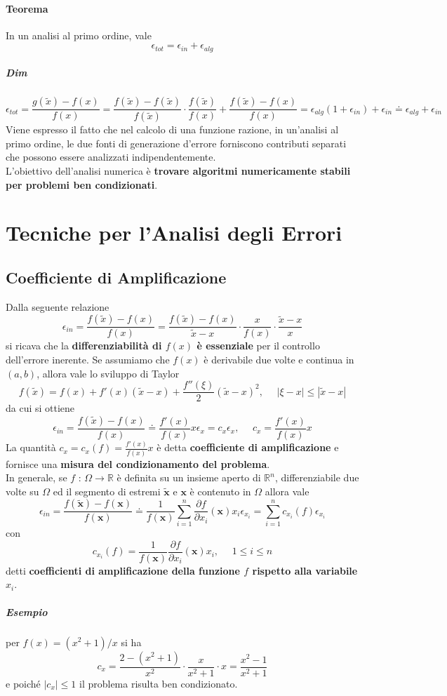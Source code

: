 \documentclass[10pt]{book}
\begin{document}
\paragraph{Teorema} In un analisi al primo ordine, vale $$\epsilon_{tot} = \epsilon_{in} + \epsilon_{alg}$$
\subparagraph{Dim} $$\epsilon_{tot} = \frac{g(\tilde{x}) - f(x)}{f(x)} = \frac{f(\tilde{x}) - f(\tilde{x})}{f(\tilde{x})}\cdot\frac{f(\tilde{x})}{f(x)} + \frac{f(\tilde{x}) - f(x)}{f(x)} = \epsilon_{alg}(1 + \epsilon_{in}) + \epsilon_{in} \doteq \epsilon_{alg} + \epsilon_{in}$$
Viene espresso il fatto che nel calcolo di una funzione razione, in un'analisi al primo ordine, le due fonti di generazione d'errore forniscono contributi separati che possono essere analizzati indipendentemente.\\
L'obiettivo dell'analisi numerica è \textbf{trovare algoritmi numericamente stabili per problemi ben condizionati}.
\section{Tecniche per l'Analisi degli Errori}
\subsection{Coefficiente di Amplificazione}
Dalla seguente relazione $$\epsilon_{in} = \frac{f(\tilde{x}) - f(x)}{f(x)} = \frac{f(\tilde{x}) - f(x)}{\tilde{x} - x}\cdot\frac{x}{f(x)}\cdot\frac{\tilde{x} - x}{x}$$ si ricava che la \textbf{differenziabilità di $f(x)$ è essenziale} per il controllo dell'errore inerente. Se assumiamo che $f(x)$ è derivabile due volte e continua in $(a, b)$, allora vale lo sviluppo di Taylor $$f(\tilde{x}) = f(x) + f'(x)(\tilde{x} - x) + \frac{f''(\xi)}{2}(\tilde{x} - x)^2,\:\:\:\:\:\:|\xi - x| \leq |\tilde{x} - x| $$ da cui si ottiene $$ \epsilon_{in} = \frac{f(\tilde{x}) - f(x)}{f(x)} \doteq \frac{f'(x)}{f(x)}x\epsilon_x = c_x\epsilon_x,\:\:\:\:\:\:c_x = \frac{f'(x)}{f(x)}x $$
La quantità $c_x = c_x(f) = \frac{f'(x)}{f(x)}x$ è detta \textbf{coefficiente di amplificazione} e fornisce una \textbf{misura del condizionamento del problema}.\\
In generale, se $f$ : $\Omega \rightarrow \mathbb{R}$ è definita su un insieme aperto di $\mathbb{R}^n$, differenziabile due volte su $\Omega$ ed il segmento di estremi $\tilde{\textbf{x}}$ e $\textbf{x}$ è contenuto in $\Omega$ allora vale
$$ \epsilon_{in} = \frac{f(\tilde{\textbf{x}}) - f(\textbf{x})}{f(\textbf{x})} \doteq \frac{1}{f(\textbf{x})}\sum_{i=1}^n \frac{\partial f}{\partial x_i}(\textbf{x})x_i\epsilon_{x_i} = \sum_{i=1}^n c_{x_i}(f)\epsilon_{x_i}$$
con $$c_{x_i}(f) = \frac{1}{f(\textbf{x})}\frac{\partial f}{\partial x_i}(\textbf{x})x_i,\:\:\:\:\:\:1 \leq i \leq n$$
detti \textbf{coefficienti di amplificazione della funzione $f$ rispetto alla variabile $x_i$}.
\subparagraph{Esempio} per $f(x) = (x^2 + 1)/x$ si ha $$c_x = \frac{2 - (x^2 + 1)}{x^2}\cdot \frac{x}{x^2 + 1}\cdot x = \frac{x^2 - 1}{x^2 + 1}$$ e poiché $|c_x| \leq 1$ il problema risulta ben condizionato.
\end{document}
